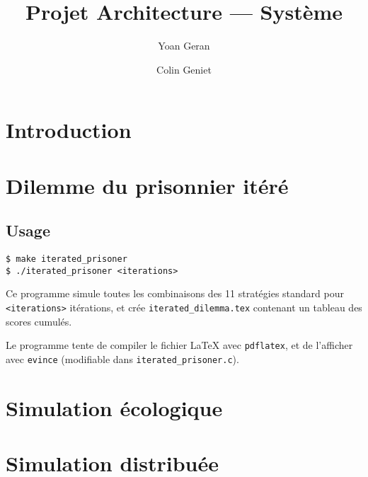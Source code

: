 \documentclass[10pt]{article}
\title{Projet Architecture --- Système}
\author{Yoan Geran \and Colin Geniet}
\begin{document}
\maketitle
\tableofcontents

\section*{Introduction}

\section{Dilemme du prisonnier itéré}
\subsection{Usage}
\begin{verbatim}
$ make iterated_prisoner
$ ./iterated_prisoner <iterations>
\end{verbatim}

Ce programme simule toutes les combinaisons des 11 stratégies standard pour \verb|<iterations>| itérations,
et crée \verb|iterated_dilemma.tex| contenant un tableau des scores cumulés.

Le programme tente de compiler le fichier \LaTeX{} avec \verb|pdflatex|, et de l'afficher avec \verb|evince|
(modifiable dans \verb|iterated_prisoner.c|).

\section{Simulation écologique}

\section{Simulation distribuée}
\end{document}
